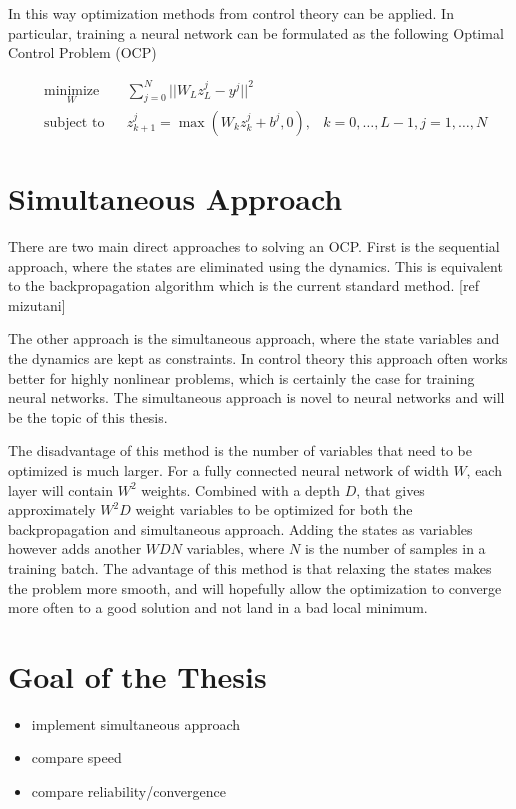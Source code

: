 In this way optimization methods from control theory can be applied. In particular, training a neural network can be formulated as the following Optimal Control Problem (OCP)

\begin{equation}
	\begin{aligned}
	& \underset{W}{\text{minimize}}
	& & \sum\limits_{j=0}^{N}||W_Lz_L^j - y^j||^2 \\
	& \text{subject to}
	& & z_{k+1}^j = \max(W_kz_k^j + b^j,0), &k = 0,\ldots,L-1,j = 1,\ldots,N
	\end{aligned}
	\label{ocp-eq}
\end{equation}


\section{Simultaneous Approach}
There are two main direct approaches to solving an OCP. First is the sequential approach, where the states are eliminated using the dynamics. This is equivalent to the backpropagation algorithm which is the current standard method. [ref mizutani]

The other approach is the simultaneous approach, where the state variables and the dynamics are kept as constraints. In control theory this approach often works better for highly nonlinear problems, which is certainly the case for training neural networks. The simultaneous approach is novel to neural networks and will be the topic of this thesis.

The disadvantage of this method is the number of variables that need to be optimized is much larger. For a fully connected neural network of width $W$, each layer will contain $W^2$ weights. Combined with a depth $D$, that gives approximately $W^2D$ weight variables to be optimized for both the backpropagation and simultaneous approach. Adding the states as variables however adds another $WDN$ variables, where $N$ is the number of samples in a training batch. The advantage of this method is that relaxing the states makes the problem more smooth, and will hopefully allow the optimization to converge more often to a good solution and not land in a bad local minimum.

\section{Goal of the Thesis}

\begin{itemize}
\item implement simultaneous approach

\item compare speed

\item compare reliability/convergence
\end{itemize}



